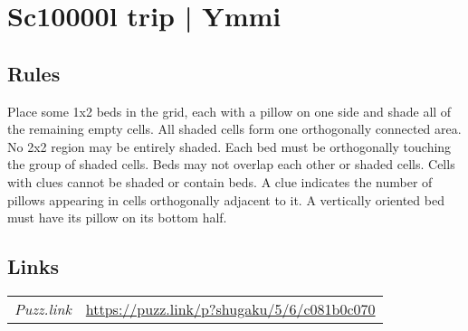 \section{Sc10000l trip | {\normalfont Ymmi}}
\label{sec:08-sc10000l-trip-ymmi}

\subsection*{Rules}
\begin{markdown}
Place some 1x2 beds in the grid, each with a pillow on one side and shade all of the remaining empty cells. All shaded cells form one orthogonally connected area. No 2x2 region may be entirely shaded. Each bed must be orthogonally touching the group of shaded cells. Beds may not overlap each other or shaded cells. Cells with clues cannot be shaded or contain beds. A clue indicates the number of pillows appearing in cells orthogonally adjacent to it. A vertically oriented bed must have its pillow on its bottom half.


\end{markdown}
\subsection*{Links}
\begin{tabularx}{\textwidth}{l X}
\emph{Puzz.link} & \url{https://puzz.link/p?shugaku/5/6/c081b0c070} \\
\end{tabularx}
\pagebreak
